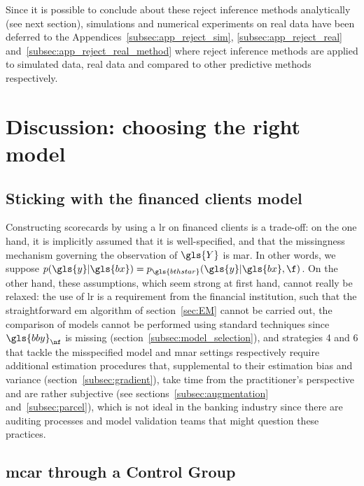 \bigskip

Since it is possible to conclude about these reject inference methods analytically (see next section), simulations and numerical experiments on real data have been deferred to the Appendices~\ref{subsec:app_reject_sim}, \ref{subsec:app_reject_real} and~\ref{subsec:app_reject_real_method} where reject inference methods are applied to simulated data, real data and compared to other predictive methods respectively.


\section{Discussion: choosing the right model} \label{sec:conclusion_reject}

\subsection{Sticking with the financed clients model}

Constructing scorecards by using a \gls{lr} on financed clients is a trade-off: on the one hand, it is implicitly assumed that it is well-specified, and that the missingness mechanism governing the observation of $\gls{Y}$ is \gls{mar}. In other words, we suppose $p(\gls{y} | \gls{bx}) = p_{\gls{bthstar}}(\gls{y} | \gls{bx}, \f)$. On the other hand, these assumptions, which seem strong at first hand, cannot really be relaxed: the use of \gls{lr} is a requirement from the financial institution, such that the straightforward \gls{em} algorithm of section~\ref{sec:EM} cannot be carried out, the comparison of models cannot be performed using standard techniques since $\gls{bby}_{\nf}$ is missing (section~\ref{subsec:model_selection}), and strategies 4 and 6 that tackle the misspecified model and \gls{mnar} settings respectively require additional estimation procedures that, supplemental to their estimation bias and variance (section~\ref{subsec:gradient}), take time from the practitioner's perspective and are rather subjective (see sections~\ref{subsec:augmentation} and~\ref{subsec:parcel}), which is not ideal in the banking industry since there are auditing processes and model validation teams that might question these practices.

\subsection{\gls{mcar} through a Control Group}

